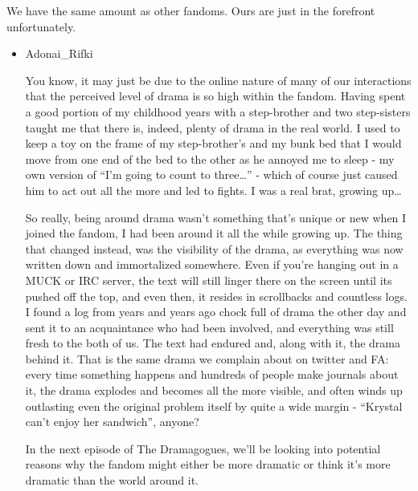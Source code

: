 \begin{itemize}
\begin{itemize}
    We have the same amount as other fandoms. Ours are just in the forefront unfortunately.

    \begin{itemize}
    \tightlist
    \item
      Adonai\_Rifki

      You know, it may just be due to the online nature of many of our interactions that the perceived level of drama is so high within the fandom. Having spent a good portion of my childhood years with a step-brother and two step-sisters taught me that there is, indeed, plenty of drama in the real world. I used to keep a toy on the frame of my step-brother's and my bunk bed that I would move from one end of the bed to the other as he annoyed me to sleep - my own version of ``I'm going to count to three\ldots{}'' - which of course just caused him to act out all the more and led to fights. I was a real brat, growing up\ldots{}

      So really, being around drama wasn't something that's unique or new when I joined the fandom, I had been around it all the while growing up. The thing that changed instead, was the visibility of the drama, as everything was now written down and immortalized somewhere. Even if you're hanging out in a MUCK or IRC server, the text will still linger there on the screen until its pushed off the top, and even then, it resides in scrollbacks and countless logs. I found a log from years and years ago chock full of drama the other day and sent it to an acquaintance who had been involved, and everything was still fresh to the both of us. The text had endured and, along with it, the drama behind it. That is the same drama we complain about on twitter and FA: every time something happens and hundreds of people make journals about it, the drama explodes and becomes all the more visible, and often winds up outlasting even the original problem itself by quite a wide margin - ``Krystal can't enjoy her sandwich'', anyone?

      In the next episode of The Dramagogues, we'll be looking into potential reasons why the fandom might either be more dramatic or think it's more dramatic than the world around it.
    \end{itemize}
  \end{itemize}
\end{itemize}
